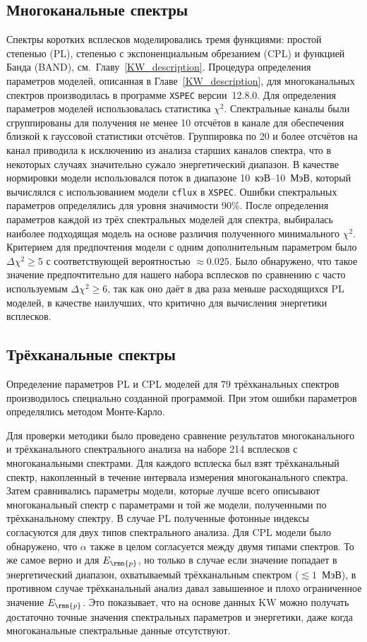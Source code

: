 \subsection{Многоканальные спектры}
Спектры коротких всплесков моделировались тремя функциями: простой степенью (PL), степенью с экспоненциальным 
обрезанием (CPL) и функцией Банда (BAND), см.~Главу~\ref{KW_description}.
Процедура определения параметров моделей, описанная в Главе~\ref{KW_description}, 
для многоканальных спектров производилась в программе 
\texttt{XSPEC}\citep{Arnaud_1996ASPC} версии~12.8.0.
Для определения параметров моделей использовалась статистика $\chi^2$. 
Спектральные каналы были сгруппированы для получения не менее 10 отсчётов в канале для обеспечения 
близкой к гауссовой статистики отсчётов. Группировка по 20 и более отсчётов на канал 
приводила к исключению из анализа старших каналов спектра, 
что в некоторых случаях значительно сужало энергетический диапазон. 
В качестве нормировки модели использовался поток в диапазоне 10~кэВ--10~МэВ, 
который вычислялся с использованием модели \texttt{cflux} в \texttt{XSPEC}.
Ошибки спектральных параметров определялись для уровня 
значимости 90\%.
После определения параметров каждой из трёх спектральных моделей для спектра, 
выбиралась наиболее подходящая модель на основе различия полученного минимального $\chi^2$. 
Критерием для предпочтения модели с одним дополнительным параметром было $\Delta \chi^2 \geq 5$ 
с соответствующей вероятностью $\approx 0.025$. Было обнаружено, что такое значение предпочтительно 
для нашего набора всплесков по сравнению с часто используемым $\Delta \chi^2 \geq 6$,
так как оно даёт в два раза меньше расходящихся PL моделей, в качестве наилучших,
что критично для вычисления энергетики всплесков.


\subsection{Трёхканальные спектры}
Определение параметров PL и CPL моделей для 79 трёхканальных спектров производилось 
специально созданной программой. При этом ошибки параметров определялись методом Монте-Карло.

Для проверки методики было проведено сравнение результатов многоканального и трёхканального спектрального анализа
на наборе 214 всплесков с многоканальными спектрами.
Для каждого всплеска был взят  трёхканальный спектр, накопленный в течение 
интервала измерения многоканального спектра.
Затем сравнивались параметры модели, которые лучше всего описывают многоканальный спектр
с параметрами и той же модели, полученными по трёхканальному спектру.
В случае PL полученные фотонные индексы согласуются для двух типов
спектрального анализа. Для CPL модели было обнаружено, что  $\alpha$ также в целом
согласуется между двумя типами спектров. То же самое верно и для $E_\rmn{p}$, но
только в случае если значение попадает в энергетический диапазон, охватываемый трёхканальным спектром
($\lesssim 1$~МэВ), в противном случае трёхканальный анализ давал завышенное и 
плохо ограниченное значение $E_\rmn{p}$. Это показывает, что на основе данных KW 
можно получать достаточно точные значения спектральных параметров и энергетики,
даже когда многоканальные спектральные данные отсутствуют.

